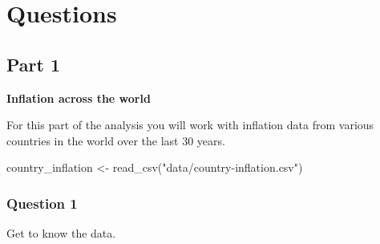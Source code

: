 \documentclass[
  letterpaper,
  DIV=11,
  numbers=noendperiod]{scrartcl}
\newenvironment{Shaded}{\begin{snugshade}}{\end{snugshade}}
\newcommand{\FunctionTok}[1]{\textcolor[rgb]{0.28,0.35,0.67}{#1}}
\newcommand{\NormalTok}[1]{\textcolor[rgb]{0.00,0.23,0.31}{#1}}
\newcommand{\OtherTok}[1]{\textcolor[rgb]{0.00,0.23,0.31}{#1}}
\newcommand{\StringTok}[1]{\textcolor[rgb]{0.13,0.47,0.30}{#1}}
\begin{document}
\section{Questions}\label{questions}

\subsection{Part 1}\label{part-1}

\textbf{Inflation across the world}

For this part of the analysis you will work with inflation data from
various countries in the world over the last 30 years.

\begin{Shaded}
\begin{Highlighting}[]
\NormalTok{country\_inflation }\OtherTok{\textless{}{-}} \FunctionTok{read\_csv}\NormalTok{(}\StringTok{"data/country{-}inflation.csv"}\NormalTok{)}
\end{Highlighting}
\end{Shaded}

\subsubsection{Question 1}\label{question-1}

Get to know the data.
\end{document}
